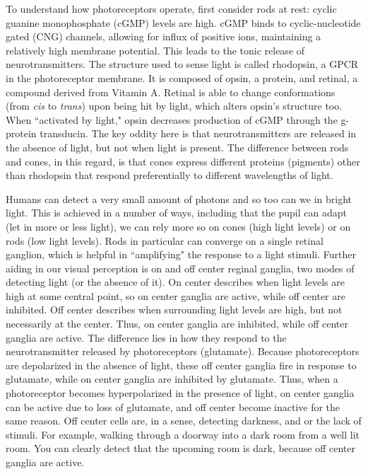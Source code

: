 To understand how photoreceptors operate, first consider rods at rest: cyclic guanine monophosphate (cGMP) levels are high. cGMP binds to cyclic-nucleotide gated (CNG) channels, allowing for influx of positive ions, maintaining a relatively high membrane potential. This leads to the tonic release of neurotransmitters. The structure used to sense light is called rhodopsin, a GPCR in the photoreceptor membrane. It is composed of opsin, a protein, and retinal, a compound derived from Vitamin A. Retinal is able to change conformations (from \textit{cis} to \textit{trans}) upon being hit by light, which alters opsin's structure too. When ``activated by light," opsin decreases production of cGMP through the g-protein transducin. The key oddity here is that neurotransmitters are released in the absence of light, but not when light is present. The difference between rods and cones, in this regard, is that cones express different proteins (pigments) other than rhodopsin that respond preferentially to different wavelengths of light.\newline

Humans can detect a very small amount of photons and so too can we in bright light. This is achieved in a number of ways, including that the pupil can adapt (let in more or less light), we can rely more so on cones (high light levels) or on rods (low light levels). Rods in particular can converge on a single retinal ganglion, which is helpful in ``amplifying" the response to a light stimuli. Further aiding in our visual perception is on and off center reginal ganglia,  two modes of detecting light (or the absence of it). On center describes when light levels are high at some central point, so on center ganglia are active, while off center are inhibited. Off center describes when surrounding light levels are high, but not necessarily at the center. Thus, on center ganglia are inhibited, while off center ganglia are active. The difference lies in how they respond to the neurotransmitter released by photoreceptors (glutamate). Because photoreceptors are depolarized in the absence of light, these off center ganglia fire in response to glutamate, while on center ganglia are inhibited by glutamate. Thus, when a photoreceptor becomes hyperpolarized in the presence of light, on center ganglia can be active due to loss of glutamate, and off center become inactive for the same reason. Off center cells are, in a sense, detecting darkness, and or the lack of stimuli. For example, walking through a doorway into a dark room from a well lit room. You can clearly detect that the upcoming room is dark, because off center ganglia are active.

